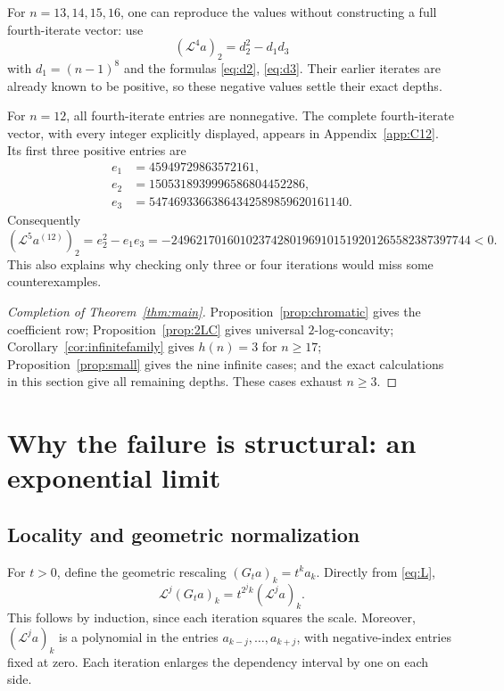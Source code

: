 \documentclass[11pt,a4paper]{article}
\theoremstyle{definition}
\newcommand{\Lop}{\mathcal L}
\begin{document}
For $n=13,14,15,16$, one can reproduce the values without constructing a
full fourth-iterate vector: use
\begin{equation}\label{eq:e2}
  (\Lop^4a)_2=d_2^2-d_1d_3
\end{equation}
with $d_1=(n-1)^8$ and the formulas \eqref{eq:d2}, \eqref{eq:d3}.
Their earlier iterates are already known to be positive, so these
negative values settle their exact depths.

For $n=12$, all fourth-iterate entries are nonnegative. The complete
fourth-iterate vector, with every integer explicitly displayed, appears
in Appendix~\ref{app:C12}. Its first three positive entries are
\begin{align*}
 e_1&=45949729863572161,\\
 e_2&=1505318939996586804452286,\\
 e_3&=54746933663864342589859620161140.
\end{align*}
Consequently
\[
 (\Lop^5a^{(12)})_2=e_2^2-e_1e_3
  =-249621701601023742801969101519201265582387397744<0.
\]
This also explains why checking only three or four iterations would miss
some counterexamples.

\begin{proof}[Completion of Theorem~\ref{thm:main}]
Proposition~\ref{prop:chromatic} gives the coefficient row;
Proposition~\ref{prop:2LC} gives universal $2$-log-concavity;
Corollary~\ref{cor:infinitefamily} gives $h(n)=3$ for $n\ge17$;
Proposition~\ref{prop:small} gives the nine infinite cases; and the exact
calculations in this section give all remaining depths. These cases
exhaust $n\ge3$.
\end{proof}

\section{Why the failure is structural: an exponential limit}\label{sec:limit}

\subsection{Locality and geometric normalization}
For $t>0$, define the geometric rescaling $(G_ta)_k=t^ka_k$. Directly
from \eqref{eq:L},
\begin{equation}\label{eq:scaling}
 \Lop^j(G_ta)_k=t^{2^j k}(\Lop^ja)_k.
\end{equation}
This follows by induction, since each iteration squares the scale.
Moreover, $(\Lop^ja)_k$ is a polynomial in the entries
$a_{k-j},\ldots,a_{k+j}$, with negative-index entries fixed at zero.
Each iteration enlarges the dependency interval by one on each side.
\end{document}

